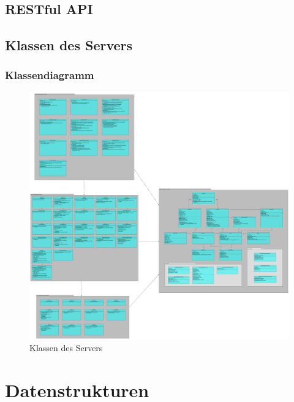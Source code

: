 \documentclass[a4paper]{scrreprt}
\begin{document}
	
	    
	\clearpage
	
	\clearpage
	
	\clearpage
	
	\clearpage
	\section{RESTful API}
	
	\clearpage
	\section{Klassen des Servers}
		\subsection{Klassendiagramm}
		\begin{figure}[H]
	       \centering
	       \includegraphics[scale = .10]{server-packages.png}
	       \caption{Klassen des Servers}
	      \end{figure}

	
 
 
\chapter{Datenstrukturen}
		
\end{document}

